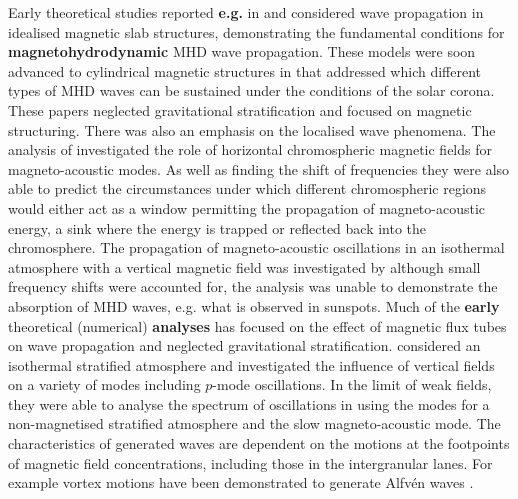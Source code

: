 \documentclass[physics,article,submit,pdftex,moreauthors]{Definitions/mdpi}
\begin{document}
Early theoretical studies reported {\bf e.g.} in \citet{Roberts1981a} and \citet{Roberts1981b} considered wave propagation in idealised magnetic slab structures, demonstrating the fundamental conditions for {\bf magnetohydrodynamic} MHD wave propagation. These models were soon advanced to cylindrical magnetic structures in \citet{EdwinandRoberts1983} that addressed 
which different types of MHD waves can be sustained under the conditions of the solar corona. These papers neglected gravitational stratification and focused on magnetic structuring. There was also an emphasis on the localised wave phenomena.  The analysis of \citet{Campbell1989} investigated the role of horizontal chromospheric magnetic fields for magneto-acoustic modes. As well as finding the shift of frequencies they were also able to predict the circumstances under which different chromospheric regions would either act as a window permitting the propagation of magneto-acoustic energy,  a sink where the energy is trapped or reflected back into the chromosphere. The propagation of magneto-acoustic oscillations in an isothermal atmosphere with a vertical magnetic field was investigated by \citet{Hindman1996} although small frequency shifts were accounted for, the analysis was unable to demonstrate the absorption of MHD waves,  e.g. what is observed in sunspots. Much of the {\bf early} theoretical (numerical) {\bf analyses} has focused on the effect of magnetic flux tubes on wave propagation and neglected gravitational stratification. \citet{Hasan1992} considered an isothermal stratified atmosphere and investigated the influence of vertical fields on a variety of modes including $p$-mode oscillations. In the limit of weak fields, they were able to analyse the spectrum of oscillations in using the modes for a non-magnetised stratified atmosphere and the slow magneto-acoustic mode.  The characteristics of generated waves are dependent on the motions at the footpoints of magnetic field concentrations, including those in the intergranular lanes. For example vortex motions have been demonstrated to generate Alfv\'en waves \citet{Fedun2009b}.   
\end{document}
